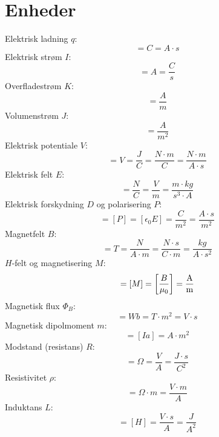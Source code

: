 \documentclass[]{article}
\theoremstyle{definition}
\begin{document}
\section{Enheder}
Elektrisk ladning $q$:
\begin{equation*}
	[q] = \unit{C} = \unit{A \cdot s}
\end{equation*}
Elektrisk strøm $I$:
\begin{equation*}
	[I] = \unit{A} = \unit{\frac{C}{s}}
\end{equation*}
Overfladestrøm $K$:
\begin{equation*}
	[K] = \unit{\frac{A}{m}}
\end{equation*}
Volumenstrøm $J$:
\begin{equation*}
	[J] = \unit{\frac{A}{m^2}}
\end{equation*}
Elektrisk potentiale $V$:
\begin{equation*}
	[V] = \unit{V} = \unit{\frac{J}{C}} = \unit{\frac{N \cdot m}{C}} = \unit{\frac{N \cdot m}{A \cdot s}}
\end{equation*}
Elektrisk felt $E$:
\begin{equation*}
	[E] = \unit{\frac{N}{C}} = \unit{\frac{V}{m}} = \unit{\frac{m\cdot kg}{s^3 \cdot A}}
\end{equation*}
Elektrisk forskydning $D$ og polarisering $P$:
\begin{equation*}
	[D] = [P] = [\epsilon_0 E] = \unit{\frac{C}{m^2}} = \unit{\frac{A \cdot s}{m^2}}
\end{equation*}
Magnetfelt $B$:
\begin{equation*}
	[B] = \unit{T} = \unit{\frac{N}{A \cdot m} =  \unit{\frac{N \cdot s}{C \cdot m}} = \unit{\frac{kg}{A \cdot s^2}}}
\end{equation*}
$H$-felt og magnetisering $M$:
\begin{equation*}
	[H] = [M] = \qty[\frac{B}{\mu_0}] = \unit{\frac{A}{m}}
\end{equation*}
Magnetisk flux $ \Phi_B$:
\begin{equation*}
	[\Phi_B] = \unit{Wb} = \unit{T \cdot m^2} = \unit{V \cdot s}
\end{equation*}
Magnetisk dipolmoment $m$:
\begin{equation*}
	[m] = [Ia] = \unit{A \cdot m^2}
\end{equation*}
Modstand (resistans) $R$:
\begin{equation*}
	[R] = \unit{\Omega} = \unit{\frac{V}{A}} = \unit{\dfrac{J \cdot s}{C^2}}
\end{equation*}
Resistivitet $\rho$:
\begin{equation*}
	[\rho] = \unit{\Omega \cdot m} = \unit{\frac{V \cdot m}{A}}
\end{equation*}
Induktans $L$:
\begin{equation*}
	[L] = [H] = \unit{\frac{V\cdot s}{A}} = \unit{\frac{J}{A^2}}
\end{equation*}
\end{document}
